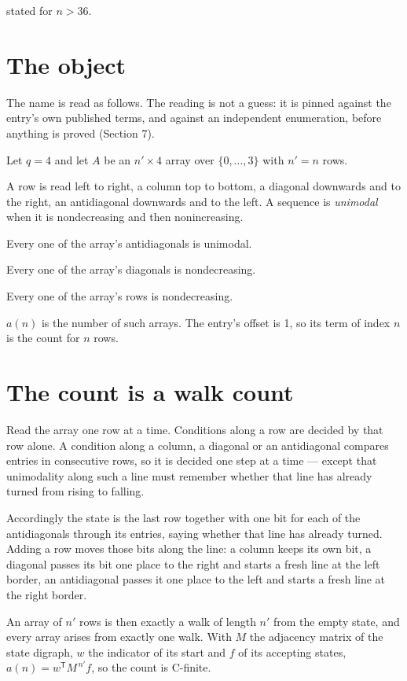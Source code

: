 \documentclass[11pt]{article}
\theoremstyle{definition}
\begin{document}
stated for $n > 36$.

\section{The object}

The name is read as follows. The reading is not a guess: it is pinned against the entry's own published terms, and against an independent enumeration, before anything is proved (Section 7).

Let $q = 4$ and let $A$ be an $n' \times 4$ array over $\{0,\dots,3\}$ with $n' = n$ rows.

A row is read left to right, a column top to bottom, a diagonal downwards and to the right, an antidiagonal downwards and to the left. A sequence is {\itshape unimodal} when it is nondecreasing and then nonincreasing.

Every one of the array's antidiagonals is unimodal.

Every one of the array's diagonals is nondecreasing.

Every one of the array's rows is nondecreasing.

$a(n)$ is the number of such arrays. The entry's offset is 1, so its term of index $n$ is the count for $n$ rows.

\section{The count is a walk count}

Read the array one row at a time. Conditions along a row are decided by that row alone. A condition along a column, a diagonal or an antidiagonal compares entries in consecutive rows, so it is decided one step at a time --- except that unimodality along such a line must remember whether that line has already turned from rising to falling.

Accordingly the state is the last row together with one bit for each of the antidiagonals through its entries, saying whether that line has already turned. Adding a row moves those bits along the line: a column keeps its own bit, a diagonal passes its bit one place to the right and starts a fresh line at the left border, an antidiagonal passes it one place to the left and starts a fresh line at the right border.

An array of $n'$ rows is then exactly a walk of length $n'$ from the empty state, and every array arises from exactly one walk. With $M$ the adjacency matrix of the state digraph, $w$ the indicator of its start and $f$ of its accepting states, $a(n) = w^{\mathsf T}M^{\,n'}f$, so the count is C-finite.
\end{document}
